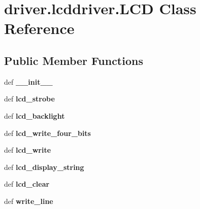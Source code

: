 \hypertarget{classdriver_1_1lcddriver_1_1LCD}{}\section{driver.\+lcddriver.\+L\+C\+D Class Reference}
\label{classdriver_1_1lcddriver_1_1LCD}
\subsection*{Public Member Functions}
\begin{DoxyCompactItemize}
\item 
\hypertarget{classdriver_1_1lcddriver_1_1LCD_a64d4c8185093f73c7c5ab6979396ed8c}{}def {\bfseries \+\_\+\+\_\+init\+\_\+\+\_\+}\label{classdriver_1_1lcddriver_1_1LCD_a64d4c8185093f73c7c5ab6979396ed8c}

\item 
\hypertarget{classdriver_1_1lcddriver_1_1LCD_a596a7bb9c9fa633b6e5890886f40a07f}{}def {\bfseries lcd\+\_\+strobe}\label{classdriver_1_1lcddriver_1_1LCD_a596a7bb9c9fa633b6e5890886f40a07f}

\item 
\hypertarget{classdriver_1_1lcddriver_1_1LCD_ab01c3cddd70d0812a0703aa65eede3e4}{}def {\bfseries lcd\+\_\+backlight}\label{classdriver_1_1lcddriver_1_1LCD_ab01c3cddd70d0812a0703aa65eede3e4}

\item 
\hypertarget{classdriver_1_1lcddriver_1_1LCD_abbda7dc71e106248dd905d4a2b14c935}{}def {\bfseries lcd\+\_\+write\+\_\+four\+\_\+bits}\label{classdriver_1_1lcddriver_1_1LCD_abbda7dc71e106248dd905d4a2b14c935}

\item 
\hypertarget{classdriver_1_1lcddriver_1_1LCD_a27bd6dcf5856e68ef269a70ca6d8557d}{}def {\bfseries lcd\+\_\+write}\label{classdriver_1_1lcddriver_1_1LCD_a27bd6dcf5856e68ef269a70ca6d8557d}

\item 
\hypertarget{classdriver_1_1lcddriver_1_1LCD_a0458faa2d341063ea03b2124fe8166df}{}def {\bfseries lcd\+\_\+display\+\_\+string}\label{classdriver_1_1lcddriver_1_1LCD_a0458faa2d341063ea03b2124fe8166df}

\item 
\hypertarget{classdriver_1_1lcddriver_1_1LCD_aca18a41a4d0e8c71dd5e8f908dc51329}{}def {\bfseries lcd\+\_\+clear}\label{classdriver_1_1lcddriver_1_1LCD_aca18a41a4d0e8c71dd5e8f908dc51329}

\item 
\hypertarget{classdriver_1_1lcddriver_1_1LCD_a7fffd68b641188b78a2876d5f04810db}{}def {\bfseries write\+\_\+line}\label{classdriver_1_1lcddriver_1_1LCD_a7fffd68b641188b78a2876d5f04810db}

\end{DoxyCompactItemize}
